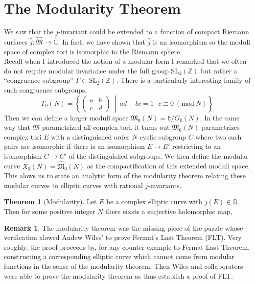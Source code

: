 \documentclass{article}
\newcommand{\SL}[0]{\mathrm{SL}}
\newcommand{\Z}{\mathbb{Z}}
\newcommand{\Q}{\mathbb{Q}}
\newcommand{\C}{\mathbb{C}}
\theoremstyle{definition}
\newtheorem{theorem}{Theorem}[section]
\newtheorem{remark}{Remark}[section]
\renewcommand{\mod}[3]{\: #1 \equiv #2 \: (\text{mod} \: #3)}
\newcommand{\h}{\mathfrak{h}}
\newcommand{\MG}{\SL_2(\Z)}
\begin{document}
{ \color{red}


\section{The Modularity Theorem}


We saw that the $j$-invariant could be extended to a function of compact Riemann surfaces $\hat{j} : \hat{\mathfrak{M}} \to \hat{\C}$. In fact, we have shown that $\hat{j}$ is an isomorphism so the moduli space of complex tori is isomorphic to the Riemann sphere. 
\bigskip\\
Recall when I introduced the notion of a modular form  I remarked that we often do not require modular invariance under the full group $\MG$ but rather a ``congruence subgroup'' $\Gamma \subset \MG$. There is a particularly interesting family of such congruence subgroups,
\[ \Gamma_0(N) = \left \{ 
\begin{pmatrix} a & b 
\\
c & d
\end{pmatrix} 
\: \middle| \: a d - b c = 1 \: \: \mod{c}{0}{N}  
\right \} \]
Then we can define a larger moduli space $\mathfrak{M}_0(N) = \h / G_0(N)$. In the same way that $\mathfrak{M}$ parametrized all complex tori, it turns out $\mathfrak{M}_0(N)$ parametrizes complex tori $E$ with a distinguished order $N$ cyclic subgroup $C$ where two such pairs are isomorphic if there is an isomorphism $E \to E'$ restricting to an isomorphism $C \to C'$ of the distinguished subgroups. We then define the modular curve $X_0(N) = \hat{\mathfrak{M}}_0(N)$ as the compactification of this extended moduli space. This alows us to state an analytic form of the modularity theorem relating these modular curves to elliptic curves with rational $j$-invariants.

\begin{theorem}[Modularity]
Let $E$ be a complex elliptic curve with $j(E) \in \Q$. Then for some positive integer $N$ there eixsts a surjective holomorphic map,
\begin{center}
\end{center}
\end{theorem}

\begin{remark}
The modularity theorem was the missing piece of  the puzzle whose verification alowed Andew Wiles' to prove Fermat's Last Theorem (FLT). Very roughly, the proof proceeds by, for any counter-example to Fermat Last Theorem, constructing a corresponding elliptic curve which cannot come from modular functions in the sense of the modularity theorem. Then Wiles and collaborators were able to prove the modularity theorem as thus establish a proof of FLT. 
\end{remark}


}
\end{document}
